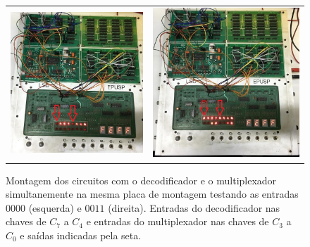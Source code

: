 \documentclass[a4,12pt]{horizon-theme}
\begin{document}
\begin{figure}[!ht]
  \centering
  \begin{tabular}{cc}
    \includegraphics[height=0.49\textwidth]{0000_in.jpeg} & \includegraphics[height=0.49\textwidth]{0011_in.jpeg}
  \end{tabular}
  \caption{Montagem dos circuitos com o decodificador e o multiplexador simultanemente na mesma placa de montagem testando as entradas $0000$ (esquerda) e $0011$ (direita). Entradas do decodificador nas chaves de $C_7$ a $C_4$ e entradas do multiplexador nas chaves de $C_3$ a $C_0$ e saídas indicadas pela seta.}
  \label{fig:montagem1}
\end{figure}
\end{document}
